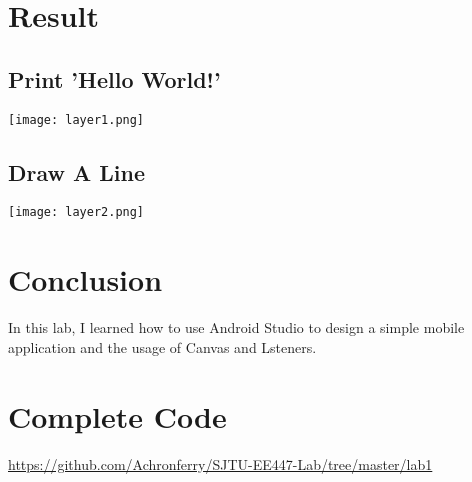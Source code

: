\documentclass[12pt]{report}
\begin{document}
\section{Result}
\subsection{Print 'Hello World!'}
\noindent\texttt{[image: layer1.png]}\\
\subsection{Draw A Line}
\noindent\texttt{[image: layer2.png]}

\section{Conclusion}
In this lab, I learned how to use Android Studio to design a simple mobile application and the usage of Canvas and Lsteners.

\section{Complete Code}
\noindent\url{https://github.com/Achronferry/SJTU-EE447-Lab/tree/master/lab1}
\end{document}
